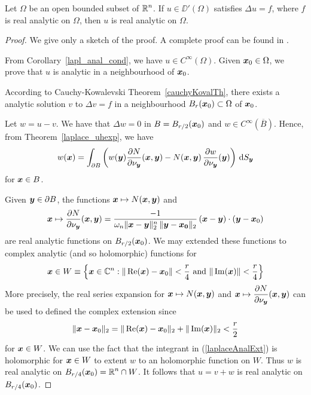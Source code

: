 \begin{cor}
Let $\Omega$ be an open bounded subset of $\displaystyle \mathbb{R}^n$.  If
$u\in \DD'(\Omega)$ satisfies $\Delta u = f$, where $f$ is real
analytic on $\Omega$, then $u$ is real analytic on $\Omega$.
\end{cor}

\begin{proof}
We give only a sketch of the proof.  A complete proof can be found in
\cite{FoPDE,Tr}.

From Corollary~\ref{lapl_anal_cond}, we have
$\displaystyle u \in C^{\infty}(\Omega)$.
Given ${\bm{x}}_0\in \Omega$, we prove that $u$ is analytic in a
neighbourhood of ${\bm{x}}_0$.

According to Cauchy-Kowalevski Theorem~\ref{cauchyKovalTh}, there
exists a analytic solution $v$ to $\Delta v = f$ in a neighbourhood
$B_r({\bm{x}}_0) \subset \Omega$ of ${\bm{x}}_0$.

Let $w = u-v$.  We have that $\Delta w =0$ in $B = B_{r/2}({\bm{x}}_0)$
and $\displaystyle w \in C^{\infty}(\overline{B})$.  Hence, from
Theorem~\ref{laplace_uhexp}, we have
\begin{equation} \label{laplaceAnalExt}
w({\bm{x}}) = \int_{\partial B} \left( w({\bm{y}})
\frac{\partial{N}}{\partial \nu_{{\bm{y}}}}({\bm{x}},{\bm{y}}) -
N({\bm{x}},{\bm{y}})\,\frac{\partial{w}}{\partial \nu_{{\bm{y}}}}({\bm{y}})\right)
\,\mathrm{d}{S}_{{\bm{y}}}
\end{equation}
for ${\bm{x}} \in B$.

Given ${\bm{y}} \in \partial B$, the functions
${\bm{x}} \mapsto N({\bm{x}},{\bm{y}})$ and
\[
{\bm{x}} \mapsto \frac{\partial{N}}{\partial \nu_{{\bm{y}}}}({\bm{x}},{\bm{y}})
= \frac{-1}{\omega_n \|{\bm{x}}-{\bm{y}}\|_2^n\,\|{\bm{y}}-{\bm{x_0}}\|_2} \, 
({\bm{x}} - {\bm{y}}) \cdot ({\bm{y}}-{\bm{x}}_0) 
\]
are real analytic functions on $B_{r/2}({\bm{x}}_0)$.  We may extended these
functions to complex analytic (and so holomorphic) functions for
\[
{\bm{x}} \in W \equiv \left\{ {\bm{x}} \in \mathbb{C}^n :
\|\operatorname{Re}({\bm{x}}) - {\bm{x}}_0\| < \frac{r}{4}
\ \text{and} \ \|\operatorname{Im}({\bm{x}})\| < \frac{r}{4} \right\}
\]
More precisely, the real series expansion for 
${\bm{x}} \mapsto N({\bm{x}},{\bm{y}})$ and
$\displaystyle {\bm{x}} \mapsto
\frac{\partial{N}}{\partial \nu_{{\bm{y}}}}({\bm{x}},{\bm{y}})$ can be used to
defined the complex extension since
\[
\| {\bm{x}} -{\bm{x}}_0 \|_2
= \|\operatorname{Re}({\bm{x}}) - {\bm{x}}_0\|_2 + \|\operatorname{Im}({\bm{x}})\|_2 < \frac{r}{2}
\]
for ${\bm{x}} \in W$.
We can use the fact that the integrant in (\ref{laplaceAnalExt}) is
holomorphic for ${\bm{x}} \in W$ to extent $w$ to an holomorphic
function on $W$.  Thus $w$ is real analytic on
$\displaystyle B_{r/4}({\bm{x}}_0) = \mathbb{R}^n \cap W$.  It
follows that $u = v+w$ is real analytic on $B_{r/4}({\bm{x}}_0)$.
\end{proof}

